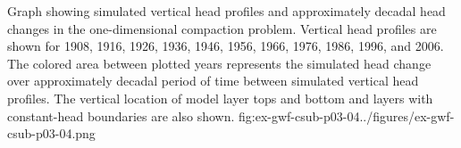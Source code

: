 \begin{StandardFigure}{
                                      Graph showing simulated vertical head profiles and approximately 
                                      decadal head changes in the one-dimensional compaction problem. 
                                      Vertical head profiles are shown for 1908, 1916, 1926, 1936, 1946, 
                                      1956, 1966, 1976, 1986, 1996, and 2006. The colored area between 
                                      plotted years represents the simulated head change over approximately 
                                      decadal period of time between simulated vertical head profiles. The 
                                      vertical location of model layer tops and bottom and layers with 
                                      constant-head boundaries are also shown.
                                     }{fig:ex-gwf-csub-p03-04}{../figures/ex-gwf-csub-p03-04.png}
\end{StandardFigure}   

